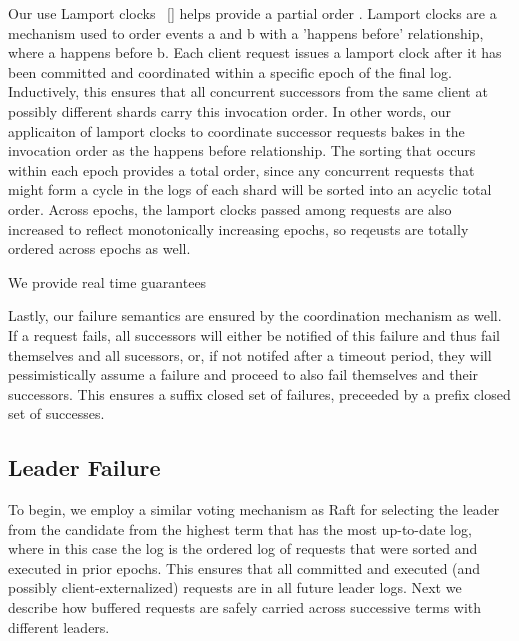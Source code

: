 Our use Lamport clocks ~\ref{} helps provide a partial order . Lamport clocks are a mechanism used to order events a and b with a 'happens before' relationship, where a happens before b. Each client request issues a lamport clock after it has been committed and coordinated within a specific epoch of the final log. Inductively, this ensures that all concurrent successors from the same client at possibly different shards carry this invocation order. In other words, our applicaiton of lamport clocks to coordinate successor requests bakes in the invocation order as the happens before relationship. The sorting that occurs within each epoch provides a total order, since any concurrent requests that might form a cycle in the logs of each shard will be sorted into an acyclic total order. Across epochs, the lamport clocks passed among requests are also increased to reflect monotonically increasing epochs, so reqeusts are totally ordered across epochs as well.

We provide real time guarantees 

Lastly, our failure semantics are ensured by the coordination mechanism as well. If a request fails, all successors will either be notified of this failure and thus fail themselves and all sucessors, or, if not notifed after a timeout period, they will pessimistically assume a failure and proceed to also fail themselves and their successors. This ensures a suffix closed set of failures, preceeded by a prefix closed set of successes.





\subsection{Leader Failure}
\label{subsec:leaderfailures}
To begin, we employ a similar voting mechanism as Raft for selecting the leader from the candidate from the highest term that has the most up-to-date log, where in this case the log is the ordered log of requests that were sorted and executed in prior epochs. This ensures that all committed and executed (and possibly client-externalized) requests are in all future leader logs. Next we describe how buffered requests are safely carried across successive terms with different leaders.

